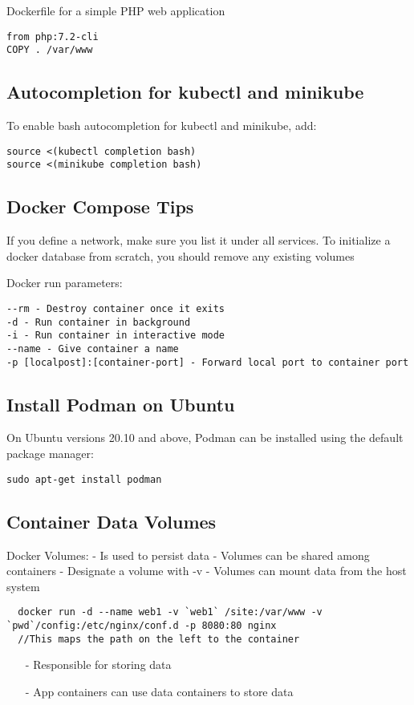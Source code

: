 \documentclass{article}
\begin{document}
Dockerfile for a simple PHP web application
\begin{verbatim}
from php:7.2-cli
COPY . /var/www
\end{verbatim}


\subsection{Autocompletion for kubectl and minikube}
To enable bash autocompletion for kubectl and minikube, add:

\begin{verbatim} 
source <(kubectl completion bash)
source <(minikube completion bash)
\end{verbatim}

\subsection{Docker Compose Tips}
If you define a network, make sure you list it under all services. To initialize a docker database from scratch, you should remove any existing volumes


Docker run parameters:
\begin{verbatim}
--rm - Destroy container once it exits
-d - Run container in background
-i - Run container in interactive mode
--name - Give container a name
-p [localpost]:[container-port] - Forward local port to container port
\end{verbatim}

\subsection{Install Podman on Ubuntu}
On Ubuntu versions 20.10 and above, Podman can be installed using the default package manager:  
\begin{verbatim}
sudo apt-get install podman
\end{verbatim}
\subsection{Container Data Volumes}
Docker Volumes:
- Is used to persist data
- Volumes can be shared among containers
- Designate a volume with -v
- Volumes can mount data from the host system

\begin{verbatim}
  docker run -d --name web1 -v `web1` /site:/var/www -v `pwd`/config:/etc/nginx/conf.d -p 8080:80 nginx
  //This maps the path on the left to the container
\end{verbatim}
\begin{itemize}
  \item[-] Responsible for storing data
  \item[-] App containers can use data containers to store data
\end{itemize}
\end{document}
